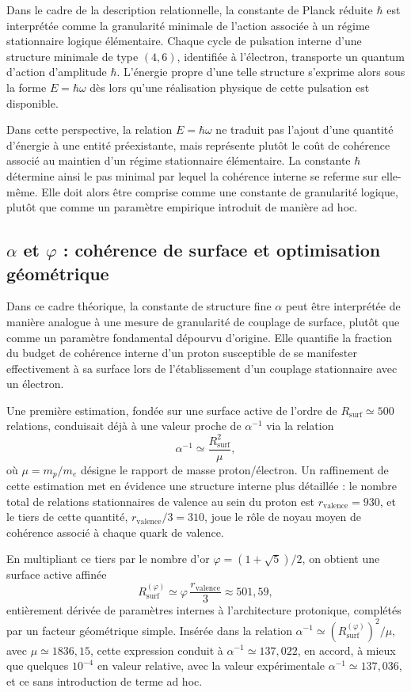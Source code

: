 \documentclass[11pt,a4paper]{article}
\begin{document}
Dans le cadre de la description relationnelle, la constante de Planck réduite \(\hbar\) est interprétée comme la granularité minimale de l’action associée à un régime stationnaire logique élémentaire. Chaque cycle de pulsation interne d’une structure minimale de type \(\left(4,6\right)\), identifiée à l’électron, transporte un quantum d’action d’amplitude \(\hbar\). L’énergie propre d’une telle structure s’exprime alors sous la forme \(E = \hbar\omega\) dès lors qu’une réalisation physique de cette pulsation est disponible.

Dans cette perspective, la relation \(E = \hbar\omega\) ne traduit pas l’ajout d’une quantité d’énergie à une entité préexistante, mais représente plutôt le coût de cohérence associé au maintien d’un régime stationnaire élémentaire. La constante \(\hbar\) détermine ainsi le pas minimal par lequel la cohérence interne se referme sur elle-même. Elle doit alors être comprise comme une constante de granularité logique, plutôt que comme un paramètre empirique introduit de manière ad hoc.

\subsection{\texorpdfstring{\(\alpha\) et \(\varphi\)}{alpha et phi} : cohérence de surface et optimisation géométrique}

Dans ce cadre théorique, la constante de structure fine \(\alpha\) peut être interprétée de manière analogue à une mesure de granularité de couplage de surface, plutôt que comme un paramètre fondamental dépourvu d’origine. Elle quantifie la fraction du budget de cohérence interne d’un proton susceptible de se manifester effectivement à sa surface lors de l’établissement d’un couplage stationnaire avec un électron.

Une première estimation, fondée sur une surface active de l’ordre de \(R_{\mathrm{surf}} \simeq 500\) relations, conduisait déjà à une valeur proche de \(\alpha^{-1}\) via la relation
\[
\alpha^{-1} \simeq \frac{R_{\mathrm{surf}}^{2}}{\mu},
\]
où \(\mu = m_p/m_e\) désigne le rapport de masse proton/électron. Un raffinement de cette estimation met en évidence une structure interne plus détaillée : le nombre total de relations stationnaires de valence au sein du proton est \(r_{\mathrm{valence}} = 930\), et le tiers de cette quantité, \(r_{\mathrm{valence}}/3 = 310\), joue le rôle de noyau moyen de cohérence associé à chaque quark de valence.

En multipliant ce tiers par le nombre d’or \(\varphi = (1+\sqrt{5})/2\), on obtient une surface active affinée
\[
R_{\mathrm{surf}}^{(\varphi)} \simeq \varphi \,\frac{r_{\mathrm{valence}}}{3} \approx 501{,}59,
\]
entièrement dérivée de paramètres internes à l’architecture protonique, complétés par un facteur géométrique simple. Insérée dans la relation \(\alpha^{-1} \simeq \left(R_{\mathrm{surf}}^{(\varphi)}\right)^{2}/\mu\), avec \(\mu \simeq 1836{,}15\), cette expression conduit à \(\alpha^{-1} \simeq 137{,}022\), en accord, à mieux que quelques \(10^{-4}\) en valeur relative, avec la valeur expérimentale \(\alpha^{-1} \simeq 137{,}036\), et ce sans introduction de terme ad hoc.
\end{document}
